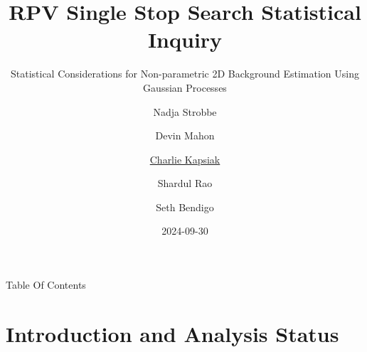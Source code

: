 \documentclass[10pt]{beamer}
\author[Charlie Kapsiak (UMN Single Stop Group) ]{
  Nadja Strobbe\inst{1} \and
  Devin Mahon\inst{1} \and
  \underline{Charlie Kapsiak}\inst{1} \and
  Shardul Rao\inst{1} \and
  Seth Bendigo\inst{1}
}
\institute{\inst{1}University of Minnesota}
\title[Single Stop Update]{RPV Single Stop Search Statistical Inquiry}
\subtitle{Statistical Considerations for Non-parametric 2D Background Estimation Using Gaussian Processes}
\date{2024-09-30}
\begin{document}
\begin{frame}
  \maketitle
\end{frame}

\begin{frame}{Table Of Contents}
  \tableofcontents
\end{frame}

%   
%     
%   
%   
%   
%   

\section[Intro]{Introduction and Analysis Status}
\end{document}
